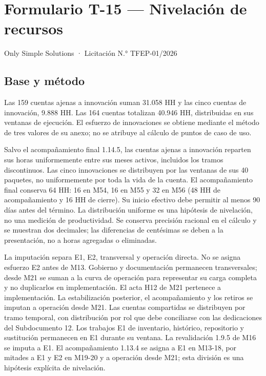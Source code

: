 \section{Formulario T-15 — Nivelación de recursos}

Only Simple Solutions · Licitación N.° TFEP-01/2026

\subsection{Base y método}

Las 159 cuentas ajenas a innovación suman 31.058 HH y las cinco cuentas de innovación, 9.888 HH. Las 164 cuentas totalizan 40.946 HH, distribuidas en sus ventanas de ejecución. El esfuerzo de innovaciones se obtiene mediante el método de tres valores de su anexo; no se atribuye al cálculo de puntos de caso de uso.

Salvo el acompañamiento final 1.14.5, las cuentas ajenas a innovación reparten sus horas uniformemente entre sus meses activos, incluidos los tramos discontinuos. Las cinco innovaciones se distribuyen por las ventanas de sus 40 paquetes, no uniformemente por toda la vida de la cuenta. El acompañamiento final conserva 64 HH: 16 en M54, 16 en M55 y 32 en M56 (48 HH de acompañamiento y 16 HH de cierre). Su inicio efectivo debe permitir al menos 90 días antes del término. La distribución uniforme es una hipótesis de nivelación, no una medición de productividad. Se conserva precisión racional en el cálculo y se muestran dos decimales; las diferencias de centésimas se deben a la presentación, no a horas agregadas o eliminadas.

La imputación separa E1, E2, transversal y operación directa. No se asigna esfuerzo E2 antes de M13. Gobierno y documentación permanecen transversales; desde M21 se suman a la curva de operación para representar su carga completa y no duplicarlos en implementación. El acta H12 de M21 pertenece a implementación. La estabilización posterior, el acompañamiento y los retiros se imputan a operación desde M21. Las cuentas compartidas se distribuyen por tramo temporal, con distribución por rol que debe conciliarse con las dedicaciones del Subdocumento 12. Los trabajos E1 de inventario, histórico, repositorio y sustitución permanecen en E1 durante su ventana. La revalidación 1.9.5 de M16 se imputa a E1. El acompañamiento 1.13.4 se asigna a E1 en M13-18, por mitades a E1 y E2 en M19-20 y a operación desde M21; esta división es una hipótesis explícita de nivelación.

